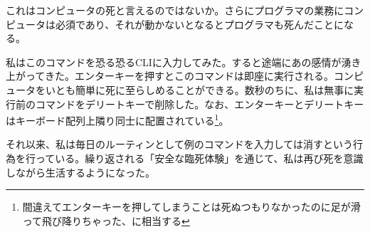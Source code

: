 \documentclass[a4paper]{article}
\begin{document}
これはコンピュータの死と言えるのではないか。さらにプログラマの業務にコンピュータは必須であり、それが動かないとなるとプログラマも死んだことになる。

私はこのコマンドを恐る恐るCLIに入力してみた。すると途端にあの感情が湧き上がってきた。エンターキーを押すとこのコマンドは即座に実行される。コンピュータをいとも簡単に死に至らしめることができる。数秒のちに、私は無事に実行前のコマンドをデリートキーで削除した。なお、エンターキーとデリートキーはキーボード配列上隣り同士に配置されている\footnote{間違えてエンターキーを押してしまうことは死ぬつもりなかったのに足が滑って飛び降りちゃった、に相当する}。

それ以来、私は毎日のルーティンとして例のコマンドを入力しては消すという行為を行っている。繰り返される「安全な臨死体験」を通じて、私は再び死を意識しながら生活するようになった。
\end{document}
